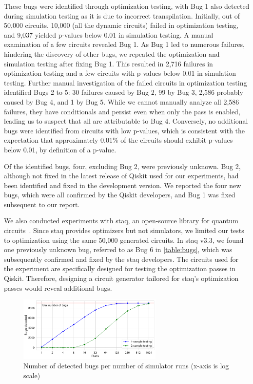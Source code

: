 These bugs were identified through optimization testing, with Bug 1 also
detected during simulation testing as it is due to incorrect transpilation.
%
Initially, out of 50,000 circuits, 10,000 (all the dynamic circuits) failed in
optimization testing, and 9,037 yielded p-values below 0.01 in simulation
testing.
%
A manual examination of a few circuits revealed Bug 1.
%
As Bug 1 led to numerous failures, hindering the discovery of other bugs, we
repeated the optimization and simulation testing after fixing Bug 1.
%
This resulted in 2,716 failures in optimization testing and a few circuits with
p-values below 0.01 in simulation testing.
%
Further manual investigation of the failed circuits in optimization testing
identified Bugs 2 to 5:
%
30 failures caused by Bug 2, 99 by Bug 3, 2,586 probably caused by Bug 4, and 1
by Bug 5.
%
While we cannot manually analyze all 2,586 failures, they have conditionals and
persist even when only the  pass is enabled, leading us to
suspect that all are attributable to Bug 4.
%
Conversely, no additional bugs were identified from circuits with low p-values,
which is consistent with the expectation that approximately 0.01\% of the
circuits should exhibit p-values below 0.01, by definition of a p-value.

Of the identified bugs, four, excluding Bug 2, were previously unknown.
%
Bug 2, although not fixed in the latest release of Qiskit used for our
experiments, had been identified and fixed in the development version.
%
We reported the four new bugs, which were all confirmed by the Qiskit
developers, and Bug 1 was fixed subsequent to our report.

We also conducted experiments with staq, an open-source library for quantum
circuits~\cite{staq}.
%
Since staq provides optimizers but not simulators, we limited our tests to
optimization using the same 50,000 generated circuits.
%
In staq v3.3, we found one previously unknown bug, referred to as Bug 6 in
\cref{table:bugs}, which was subsequently confirmed and fixed by the staq
developers.
%
The circuits used for the experiment are specifically designed for testing the
optimization passes in Qiskit.
%
Therefore, designing a circuit generator tailored for staq's optimization
passes would reveal additional bugs.

\begin{figure}[t]
	\centering
	\includegraphics[width=0.64\textwidth]{imgs/1-2-sample-test.pdf}
	\caption{Number of detected bugs per number of simulator runs (x-axis is log scale)}
	\label{fig:onesample}
\end{figure}

